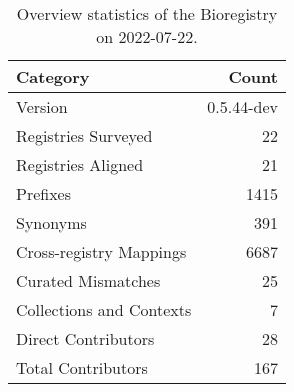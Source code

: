 \begin{table}
\centering
\caption{Overview statistics of the Bioregistry on 2022-07-22.}
\label{tab:bioregistry-summary}
\begin{tabular}{lr}
\toprule
                Category &      Count \\
\midrule
                 Version & 0.5.44-dev \\
     Registries Surveyed &         22 \\
      Registries Aligned &         21 \\
                Prefixes &       1415 \\
                Synonyms &        391 \\
 Cross-registry Mappings &       6687 \\
      Curated Mismatches &         25 \\
Collections and Contexts &          7 \\
     Direct Contributors &         28 \\
      Total Contributors &        167 \\
\bottomrule
\end{tabular}
\end{table}
